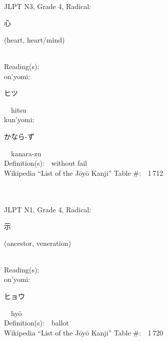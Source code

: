 \begin{multicols}{2}
{\fontsize{34pt}{40pt}  }\ \ \\  %
{JLPT N3, Grade 4, Radical:\ \ {\begin{CJK}{UTF8}{min} 心 \end{CJK}} (heart, heart/mind) } \\
Reading(s):\ \ \\
{\hspace*{1em}}on'yomi:\ \ \\
{\hspace*{2em}}{\begin{CJK}{UTF8}{min} ヒツ \end{CJK}}\ \ hitsu\ \ \\
{\hspace*{1em}}kun'yomi:\ \ \\
{\hspace*{2em}}{\begin{CJK}{UTF8}{min} かなら-ず \end{CJK}}\ \ kanara-zu\ \ \\
Definition(s):\ \ without fail \\
Wikipedia ``List of the J\=oy\=o Kanji'' Table \#:\ \ 1\,712 \\
\ \ \\
{\fontsize{34pt}{40pt}  }\ \ \\  %
{JLPT N1, Grade 4, Radical:\ \ {\begin{CJK}{UTF8}{min} 示 \end{CJK}} (ancestor, veneration) } \\
Reading(s):\ \ \\
{\hspace*{1em}}on'yomi:\ \ \\
{\hspace*{2em}}{\begin{CJK}{UTF8}{min} ヒョウ \end{CJK}}\ \ hy\=o\ \ \\
Definition(s):\ \ ballot \\
Wikipedia ``List of the J\=oy\=o Kanji'' Table \#:\ \ 1\,720 \\
\ \ \\
{\fontsize{34pt}{40pt}  }\ \ \\  %

\end{multicols}
